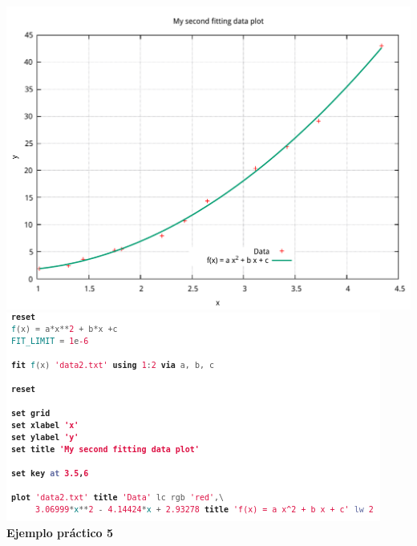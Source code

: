 \documentclass[11.5pt,a4paper]{article}
\begin{document}
\includegraphics[scale=0.40]{ejemplo9.pdf}
\includegraphics[scale=0.55]{screen10.png}\\

\textbf{Ejemplo práctico 5}
\end{document}
